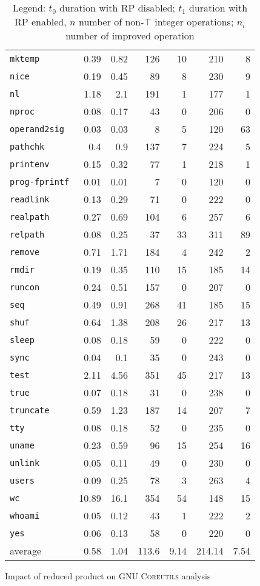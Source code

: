 \documentclass[12pt,oneside]{fithesis2}
\theoremstyle{definition}
\begin{document}
\begin{table}[ht!]
\begin{tabular}{l rrrr | rr}
    \texttt{mktemp} & 0.39 & 0.82 & 126 & 10 & 210 & 8 \\
    \texttt{nice} & 0.19 & 0.45 & 89 & 8 & 230 & 9 \\
    \texttt{nl} & 1.18 & 2.1 & 191 & 1 & 177 & 1 \\
    \texttt{nproc} & 0.08 & 0.17 & 43 & 0 & 206 & 0 \\
    \texttt{operand2sig} & 0.03 & 0.03 & 8 & 5 & 120 & 63 \\
    \texttt{pathchk} & 0.4 & 0.9 & 137 & 7 & 224 & 5 \\
    \texttt{printenv} & 0.15 & 0.32 & 77 & 1 & 218 & 1 \\
    \texttt{prog-fprintf} & 0.01 & 0.01 & 7 & 0 & 120 & 0 \\
    \texttt{readlink} & 0.13 & 0.29 & 71 & 0 & 222 & 0 \\
    \texttt{realpath} & 0.27 & 0.69 & 104 & 6 & 257 & 6 \\
    \texttt{relpath} & 0.08 & 0.25 & 37 & 33 & 311 & 89 \\
    \texttt{remove} & 0.71 & 1.71 & 184 & 4 & 242 & 2 \\
    \texttt{rmdir} & 0.19 & 0.35 & 110 & 15 & 185 & 14 \\
    \texttt{runcon} & 0.24 & 0.51 & 157 & 0 & 207 & 0 \\
    \texttt{seq} & 0.49 & 0.91 & 268 & 41 & 185 & 15 \\
    \texttt{shuf} & 0.64 & 1.38 & 208 & 26 & 217 & 13 \\
    \texttt{sleep} & 0.08 & 0.18 & 59 & 0 & 222 & 0 \\
    \texttt{sync} & 0.04 & 0.1 & 35 & 0 & 243 & 0 \\
    \texttt{test} & 2.11 & 4.56 & 351 & 45 & 217 & 13 \\
    \texttt{true} & 0.07 & 0.18 & 31 & 0 & 238 & 0 \\
    \texttt{truncate} & 0.59 & 1.23 & 187 & 14 & 207 & 7 \\
    \texttt{tty} & 0.08 & 0.18 & 52 & 0 & 235 & 0 \\
    \texttt{uname} & 0.23 & 0.59 & 96 & 15 & 254 & 16 \\
    \texttt{unlink} & 0.05 & 0.11 & 49 & 0 & 230 & 0 \\
    \texttt{users} & 0.09 & 0.25 & 78 & 3 & 263 & 4 \\
    \texttt{wc} & 10.89 & 16.1 & 354 & 54 & 148 & 15 \\
    \texttt{whoami} & 0.05 & 0.12 & 43 & 1 & 222 & 2 \\
    \texttt{yes} & 0.06 & 0.13 & 58 & 0 & 220 & 0 \\
    \midrule
    average & 0.58 & 1.04 & 113.6 & 9.14 & 214.14 & 7.54 \\

  \end{tabular}
  \caption{Impact of reduced product on \textsc{GNU Coreutils} analysis}
  \caption*{\footnotesize Legend: $t_0$ duration with RP disabled; $t_1$ duration with RP enabled, $n$ number of non-$\top$ integer operations; $n_i$ number of improved operation}
\end{table}
\end{document}
